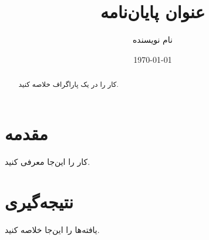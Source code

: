 \documentclass[12pt]{report}
\title{عنوان پایان‌نامه}
\author{نام نویسنده}
\date{\today}
\begin{document}
\maketitle

\begin{abstract}
کار را در یک پاراگراف خلاصه کنید.
\end{abstract}

\tableofcontents

\chapter{مقدمه}
کار را این‌جا معرفی کنید.

\chapter{نتیجه‌گیری}
یافته‌ها را این‌جا خلاصه کنید.
\end{document}
